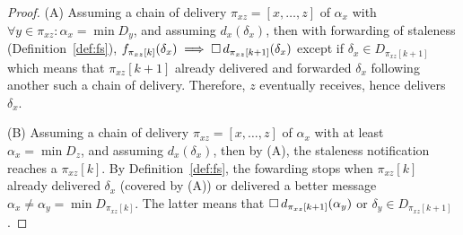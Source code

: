 \begin{proof}
  (A) Assuming a chain of delivery $\pi_{xz} = [x, \ldots, z]$ of
  $\alpha_x$ with $\forall y \in \pi_{xz}: \alpha_x = \min D_y$, and
  assuming $d_x(\delta_x)$, then with forwarding of staleness
  (Definition~\ref{def:fs}),
  $f_{\pi_{xz}[k]}(\delta_x) \implies \square\,
  d_{\pi_{xz}[k+1]}(\delta_x)$ except if $\delta_x \in D_{\pi_{xz}[k+1]}$ which
  means that $\pi_{xz}[k+1]$ already delivered and forwarded $\delta_x$
  following another such a chain of delivery. Therefore, $z$
  eventually receives, hence delivers $\delta_x$.

  \noindent (B) Assuming a chain of delivery
  $\pi_{xz} = [x, \ldots, z]$ of $\alpha_x$ with at least
  $\alpha_x = \min D_z$, and assuming $d_x(\delta_x)$, then by (A),
  the staleness notification reaches a \process $\pi_{xz}[k]$. By
  Definition~\ref{def:fs}, the fowarding stops when $\pi_{xz}[k]$
  already delivered $\delta_x$ (covered by (A)) or delivered a better
  message $\alpha_x \neq \alpha_y = \min D_{\pi_{xz}[k]}$. The latter
  means that $\square\, d_{\pi_{xz}[k+1]}(\alpha_y)$ or
  $\delta_y \in D_{\pi_{xz}[k+1]}$.

\end{proof}
